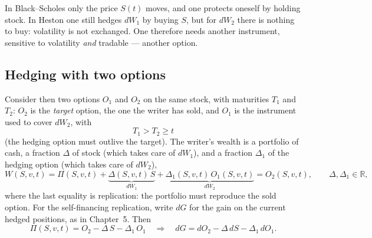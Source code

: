 In Black--Scholes only the price $S(t)$ moves, and one protects oneself by holding stock.
In Heston one still hedges $dW_1$ by buying $S$, but for $dW_2$ there is nothing to buy: volatility is not exchanged.
One therefore needs another instrument, sensitive to volatility \emph{and} tradable --- another option.

\subsection{Hedging with two options}

Consider then two options $O_1$ and $O_2$ on the same stock, with maturities $T_1$ and $T_2$: $O_2$ is the \emph{target} option, the one the writer has sold, and $O_1$ is the instrument used to cover $dW_2$, with
\begin{equation}
T_1 > T_2 \ge t
\end{equation}
(the hedging option must outlive the target).
The writer's wealth is a portfolio of cash, a fraction $\Delta$ of stock (which takes care of $dW_1$), and a fraction $\Delta_1$ of the hedging option (which takes care of $dW_2$),
\begin{equation}
W(S,v,t) = \Pi(S,v,t) + \underbrace{\Delta(S,v,t)\, S}_{dW_1} + \underbrace{\Delta_1(S,v,t)\, O_1(S,v,t)}_{dW_2}
= O_2(S,v,t), \qquad \Delta, \Delta_1 \in \mathbb{R},
\end{equation}
where the last equality is replication: the portfolio must reproduce the sold option.
For the self-financing replication, write $dG$ for the gain on the current hedged positions, as in Chapter~5.
Then
\begin{equation}
\Pi(S,v,t) = O_2 - \Delta\, S - \Delta_1\, O_1
\quad\Longrightarrow\quad
dG = dO_2 - \Delta\, dS - \Delta_1\, dO_1.
\end{equation}

